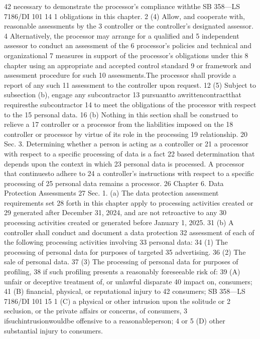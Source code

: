 42 necessary to demonstrate the processor's compliance withthe
SB 358—LS 7186/DI 101
14
1 obligations in this chapter.
2 (4) Allow, and cooperate with, reasonable assessments by the
3 controller or the controller's designated assessor.
4 Alternatively, the processor may arrange for a qualified and
5 independent assessor to conduct an assessment of the
6 processor's policies and technical and organizational
7 measures in support of the processor's obligations under this
8 chapter using an appropriate and accepted control standard
9 or framework and assessment procedure for such
10 assessments.The processor shall provide a report of any such
11 assessment to the controller upon request.
12 (5) Subject to subsection (b), engage any subcontractor
13 pursuantto awrittencontractthat requiresthe subcontractor
14 to meet the obligations of the processor with respect to the
15 personal data.
16 (b) Nothing in this section shall be construed to relieve a
17 controller or a processor from the liabilities imposed on the
18 controller or processor by virtue of its role in the processing
19 relationship.
20 Sec. 3. Determining whether a person is acting as a controller or
21 a processor with respect to a specific processing of data is a fact
22 based determination that depends upon the context in which
23 personal data is processed. A processor that continuesto adhere to
24 a controller's instructions with respect to a specific processing of
25 personal data remains a processor.
26 Chapter 6. Data Protection Assessments
27 Sec. 1. (a) The data protection assessment requirements set
28 forth in this chapter apply to processing activities created or
29 generated after December 31, 2024, and are not retroactive to any
30 processing activities created or generated before January 1, 2025.
31 (b) A controller shall conduct and document a data protection
32 assessment of each of the following processing activities involving
33 personal data:
34 (1) The processing of personal data for purposes of targeted
35 advertising.
36 (2) The sale of personal data.
37 (3) The processing of personal data for purposes of profiling,
38 if such profiling presents a reasonably foreseeable risk of:
39 (A) unfair or deceptive treatment of, or unlawful disparate
40 impact on, consumers;
41 (B) financial, physical, or reputational injury to
42 consumers;
SB 358—LS 7186/DI 101
15
1 (C) a physical or other intrusion upon the solitude or
2 seclusion, or the private affairs or concerns, of consumers,
3 ifsuchintrusionwouldbe offensive to a reasonableperson;
4 or
5 (D) other substantial injury to consumers.
